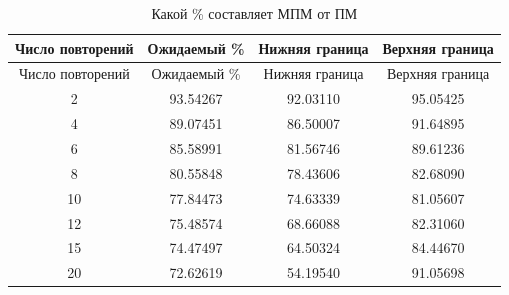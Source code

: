 \documentclass[
]{article}
\newenvironment{Shaded}{\begin{snugshade}}{\end{snugshade}}
\newcommand{\DataTypeTok}[1]{\textcolor[rgb]{0.13,0.29,0.53}{#1}}
\newcommand{\DecValTok}[1]{\textcolor[rgb]{0.00,0.00,0.81}{#1}}
\newcommand{\FloatTok}[1]{\textcolor[rgb]{0.00,0.00,0.81}{#1}}
\newcommand{\KeywordTok}[1]{\textcolor[rgb]{0.13,0.29,0.53}{\textbf{#1}}}
\newcommand{\NormalTok}[1]{#1}
\newcommand{\OperatorTok}[1]{\textcolor[rgb]{0.81,0.36,0.00}{\textbf{#1}}}
\newcommand{\StringTok}[1]{\textcolor[rgb]{0.31,0.60,0.02}{#1}}
\begin{document}
\begin{Shaded}
\end{Shaded}

\begin{longtable}[]{@{}cccc@{}}
\caption{Какой \% составляет МПМ от ПМ}\tabularnewline
\toprule
Число повторений & Ожидаемый \% & Нижняя граница & Верхняя
граница\tabularnewline
\midrule
\endfirsthead
\toprule
Число повторений & Ожидаемый \% & Нижняя граница & Верхняя
граница\tabularnewline
\midrule
\endhead
2 & 93.54267 & 92.03110 & 95.05425\tabularnewline
4 & 89.07451 & 86.50007 & 91.64895\tabularnewline
6 & 85.58991 & 81.56746 & 89.61236\tabularnewline
8 & 80.55848 & 78.43606 & 82.68090\tabularnewline
10 & 77.84473 & 74.63339 & 81.05607\tabularnewline
12 & 75.48574 & 68.66088 & 82.31060\tabularnewline
15 & 74.47497 & 64.50324 & 84.44670\tabularnewline
20 & 72.62619 & 54.19540 & 91.05698\tabularnewline
\bottomrule
\end{longtable}
\end{document}
